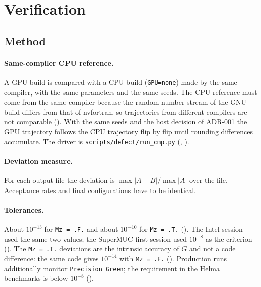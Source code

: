 \section{Verification}
\label{sec:verif}

\subsection{Method}

\paragraph{Same-compiler CPU reference.} A GPU build is compared with a CPU build (\texttt{GPU=none}) made by the same compiler, with the same parameters and the same seeds. The CPU reference must come from the same compiler because the random-number stream of the GNU build differs from that of nvfortran, so trajectories from different compilers are not comparable (). With the same seeds and the host decision of ADR-001 the GPU trajectory follows the CPU trajectory flip by flip until rounding differences accumulate. The driver is \texttt{scripts/defect/run\_cmp.py} (, ).

\paragraph{Deviation measure.} For each output file the deviation is $\max|A-B|/\max|A|$ over the file. Acceptance rates and final configurations have to be identical.

\paragraph{Tolerances.} About $10^{-13}$ for \texttt{Mz = .F.} and about $10^{-10}$ for \texttt{Mz = .T.} (). The Intel session used the same two values; the SuperMUC first session used $10^{-8}$ as the criterion (). The \texttt{Mz = .T.} deviations are the intrinsic accuracy of $G$ and not a code difference: the same code gives $10^{-14}$ with \texttt{Mz = .F.} (). Production runs additionally monitor \texttt{Precision Green}; the requirement in the Helma benchmarks is below $10^{-8}$ ().

